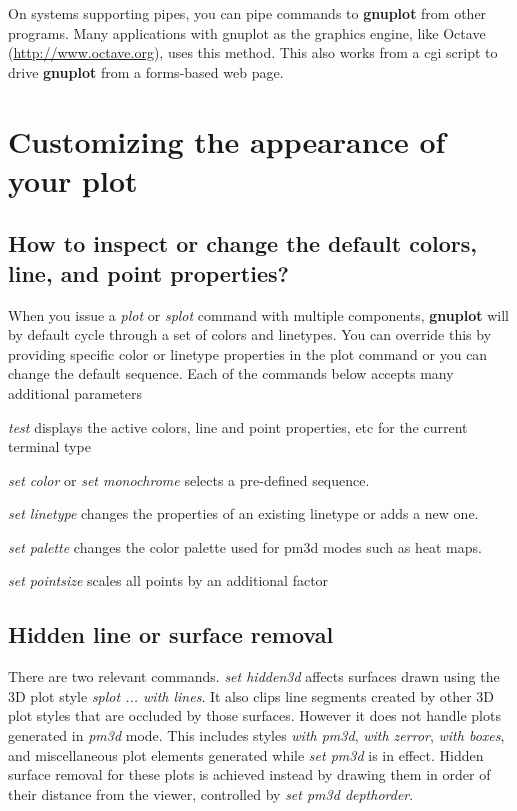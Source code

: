 \documentclass[a4paper,11pt]{article}
\def\http#1{{\small\href{http://#1}{\url{http://#1}}}}
\newcommand{\http}[1]%
            {\htmladdnormallink{\latex{\url{http://#1}}%
                    \html{\textit{http://#1}}}%
                {http://#1}%
            }
\newcommand{\gnuplot}{\textbf{gnuplot }}
\begin{document}
On systems supporting pipes, you can pipe commands to \gnuplot from other
programs. Many applications with gnuplot as the graphics engine, like Octave
(\http{www.octave.org}), uses this method. This also works from a cgi script to
drive \gnuplot from a forms-based web page.


\section{Customizing the appearance of your plot}

\subsection{How to inspect or change the default colors, line, and point properties?}

When you issue a {\em plot} or {\em splot} command with multiple components,
\gnuplot will by default cycle through a set of colors and linetypes.
You can override this by providing specific color or linetype properties in the
plot command or you can change the default sequence.
Each of the commands below accepts many additional parameters
\begin{list}{}{}
  \item
  {\em test} displays the active colors, line and point properties, etc
             for the current terminal type
  \item
  {\em set color} or {\em set monochrome} selects a pre-defined sequence.
  \item
  {\em set linetype} changes the properties of an existing linetype or adds a new one.
  \item
  {\em set palette} changes the color palette used for pm3d modes such as heat maps.
  \item
  {\em set pointsize} scales all points by an additional factor
\end{list}

\subsection{Hidden line or surface removal}

There are two relevant commands. {\em set hidden3d} affects surfaces 
drawn using the 3D plot style {\em splot ... with lines}. It also clips
line segments created by other 3D plot styles that are occluded by those
surfaces.   However it does not handle plots generated in {\em pm3d} mode.
This includes styles {\em with pm3d}, {\em with zerror}, {\em with boxes},
and miscellaneous plot elements generated while {\em set pm3d} is in effect.
Hidden surface removal for these plots is achieved instead by drawing them
in order of their distance from the viewer, controlled by
{\em set pm3d depthorder}.
\end{document}
